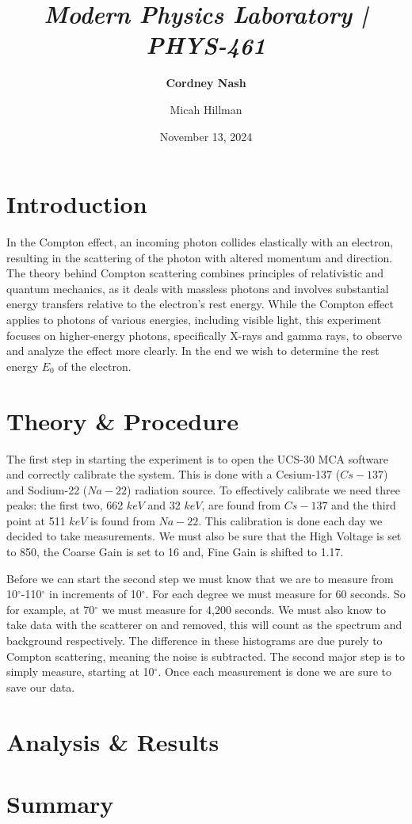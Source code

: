 \documentclass[a4paper,12pt,english]{all-in-one} %
\title{{\large\textit{Modern Physics Laboratory | PHYS-461}}\\[0.5cm]{\Huge\color{gray}\textsc{\@docsubtitle}}}
\author{\textbf{Cordney Nash}  \and Micah Hillman  }
\date{November 13, 2024}
\begin{document}
\begin{titlepage}
\maketitle\vfill
\end{titlepage}
\newpage


\section*{Introduction}
{
In the Compton effect, an incoming photon collides elastically with an electron, resulting in the scattering of the photon with altered momentum and direction. The theory behind Compton scattering combines principles of relativistic and quantum mechanics, as it deals with massless photons and involves substantial energy transfers relative to the electron’s rest energy. While the Compton effect applies to photons of various energies, including visible light, this experiment focuses on higher-energy photons, specifically X-rays and gamma rays, to observe and analyze the effect more clearly. In the end we wish to determine the rest energy $E_0$ of the electron.
}

\begin{multicols}{2}

\section*{Theory \& Procedure}
{
The first step in starting the experiment is to open the UCS-30 MCA software and correctly calibrate the system. This is done with a Cesium-137 ($Cs-137$) and Sodium-22 ($Na-22$) radiation source. To effectively calibrate we need three peaks: the first two, 662 $keV$ and 32 $keV$, are found from $Cs-137$ and the third point at 511 $keV$ is found from $Na-22$. This calibration is done each day we decided to take measurements. We must also be sure that the High Voltage is set to 850, the Coarse Gain is set to 16 and, Fine Gain is shifted to 1.17.

Before we can start the second step we must know that we are to measure from 10$^\circ$-110$^\circ$ in increments of 10$^\circ$. For each degree we must measure for 60 seconds. So for example, at 70$^\circ$ we must measure for 4,200 seconds. We must also know to take data with the scatterer on and removed, this will count as the spectrum and background respectively. The difference in these histograms are due purely to Compton scattering, meaning the noise is subtracted. The second major step is to simply measure, starting at 10$^\circ$. Once each measurement is done we are sure to save our data.  
}

\section*{Analysis \& Results}
{

}
\end{multicols}

\section*{Summary}
{

}
\end{document}
